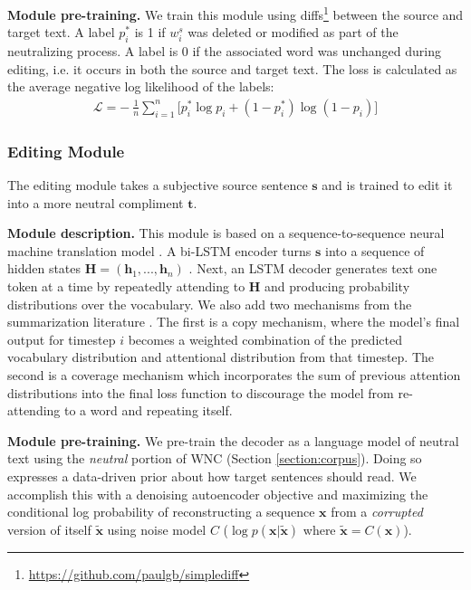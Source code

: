 \textbf{Module pre-training.} We train this module using diffs\footnote{\url{https://github.com/paulgb/simplediff}} between the source and target text. A label $p^*_i$ is 1 if $w^s_i$ was deleted or modified as part of the neutralizing process. A label is 0 if the associated word was unchanged during editing, i.e. it occurs in both the source and target text. The loss is calculated as the average negative log likelihood of the labels:
\begin{align*}
   \mathcal{L} = -\ \frac{1}{ n }\sum_{i=1}^n  \Big[ p^*_i \log p_i + (1 - p^*_i) \log (1 - p_i) \Big]
\end{align*}


\subsubsection{Editing Module}
\label{subsection:editor}
The editing module takes a subjective source sentence $\mathbf{s}$ and is trained to edit it into a more neutral compliment $\mathbf{t}$. 

\textbf{Module description.} 
This module is based on a sequence-to-sequence neural machine translation model  \cite{luong2015effective}. A bi-LSTM encoder turns $\mathbf{s}$ into a sequence of hidden states $\mathbf{H} = (\mathbf{h}_1, ..., \mathbf{h}_n)$ \cite{hochreiter1997long}. Next, an LSTM decoder generates text one token at a time by repeatedly attending to $\mathbf{H}$ and producing probability distributions over the vocabulary. We also add two mechanisms from the summarization literature \cite{see2017get}. The first is a copy mechanism,  where the model's final output for timestep $i$ becomes a weighted combination of the predicted vocabulary distribution and attentional distribution from that timestep. The second is a coverage mechanism which incorporates the sum of previous attention distributions into the final loss function to discourage the model from re-attending to a word and repeating itself. 

\textbf{Module pre-training.} 
We pre-train the decoder as a language model of neutral text using the \emph{neutral} portion of WNC (Section \ref{section:corpus}). Doing so expresses a data-driven prior about how target sentences should read.
We accomplish this with a denoising autoencoder objective \cite{hill2016learning} and maximizing the conditional log probability of reconstructing a sequence $\mathbf{x}$ from a \emph{corrupted} version of itself $\widetilde{\mathbf{x}}$ using noise model $C$ ($\log p(\mathbf{x} \vert \widetilde{\mathbf{x}})$ where $\widetilde{\mathbf{x}} = C(\mathbf{x})$).

